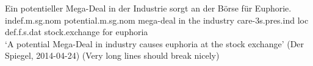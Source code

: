 \ea
\gll Ein potentieller Mega-Deal in der Industrie sorgt an der B{\"o}rse f{\"u}r Euphorie.\\
     indef.m.sg.nom potential.m.sg.nom mega-deal in the industry care-3s.pres.ind loc def.f.s.dat stock.exchange for euphoria\\
\glt `A potential Mega-Deal in industry causes euphoria at the stock exchange' (Der Spiegel, 2014-04-24) (Very long lines should break nicely)
\z